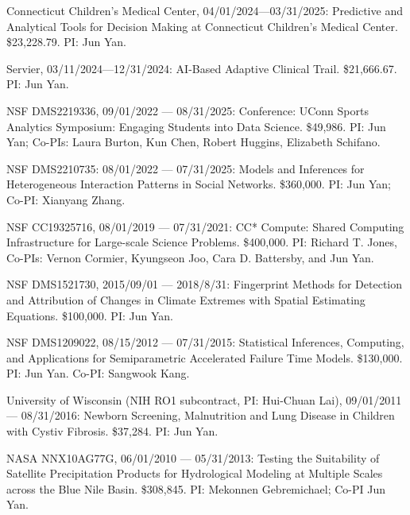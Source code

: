 \documentclass[Statistics]{vita}
\begin{document}
\begin{vita}
  \begin{Grants}
    \begin{External}
    \item Connecticut Children's Medical Center, 04/01/2024---03/31/2025: Predictive and Analytical Tools for Decision Making at Connecticut Children’s Medical Center. \$23,228.79. PI: Jun Yan.
    \item Servier, 03/11/2024---12/31/2024: AI-Based Adaptive Clinical Trail. \$21,666.67.  PI: Jun Yan.
    \item NSF DMS2219336, 09/01/2022 --- 08/31/2025: Conference: UConn Sports Analytics Symposium: Engaging Students into Data Science. \$49,986. PI: Jun Yan; Co-PIs: Laura Burton, Kun Chen,  Robert Huggins, Elizabeth Schifano.
    \item NSF DMS2210735: 08/01/2022 --- 07/31/2025: Models and Inferences for Heterogeneous Interaction Patterns in Social Networks. \$360,000. PI: Jun Yan; Co-PI: Xianyang Zhang.
    \item NSF CC19325716, 08/01/2019 --- 07/31/2021: CC* Compute: Shared Computing Infrastructure for Large-scale Science Problems. \$400,000. PI:  Richard T. Jones, Co-PIs: Vernon Cormier, Kyungseon Joo, Cara D. Battersby, and Jun Yan.
    \item NSF DMS1521730, 2015/09/01 --- 2018/8/31: Fingerprint Methods for Detection and Attribution of Changes in Climate Extremes with Spatial Estimating Equations. \$100,000. PI: Jun Yan.
    \item NSF DMS1209022, 08/15/2012 --- 07/31/2015: Statistical Inferences, Computing, and Applications for Semiparametric Accelerated Failure Time Models. \$130,000. PI: Jun Yan. Co-PI: Sangwook Kang.
    \item University of Wisconsin (NIH RO1 subcontract, PI: Hui-Chuan Lai), 09/01/2011 --- 08/31/2016: Newborn Screening, Malnutrition and Lung Disease in Children with Cystiv Fibrosis. \$37,284. PI: Jun Yan.
    \item NASA NNX10AG77G, 06/01/2010 --- 05/31/2013: Testing the Suitability of Satellite Precipitation Products for Hydrological Modeling at Multiple Scales across the Blue Nile Basin. \$308,845. PI: Mekonnen Gebremichael; Co-PI Jun Yan.

\end{External}
\end{Grants}
\end{vita}
\end{document}

